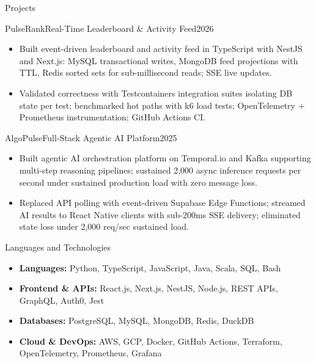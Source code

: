 \documentclass[]{mcdowellcv}
\begin{document}
\begin{cvsection}{Projects}
  \begin{cvsubsection}{PulseRank}{Real-Time Leaderboard \& Activity Feed}{2026}
    \begin{itemize}
      \item Built event-driven leaderboard and activity feed in TypeScript with NestJS and Next.js: MySQL transactional writes, MongoDB feed projections with TTL, Redis sorted sets for sub-millisecond reads; SSE live updates.
      \item Validated correctness with Testcontainers integration suites isolating DB state per test; benchmarked hot paths with k6 load tests; OpenTelemetry + Prometheus instrumentation; GitHub Actions CI.
    \end{itemize}
    \vspace{-1.5pt}
  \end{cvsubsection}

  \begin{cvsubsection}{AlgoPulse}{Full-Stack Agentic AI Platform}{2025}
    \begin{itemize}
      \item Built agentic AI orchestration platform on Temporal.io and Kafka supporting multi-step reasoning pipelines; sustained 2,000 async inference requests per second under sustained production load with zero message loss.
      \item Replaced API polling with event-driven Supabase Edge Functions; streamed AI results to React Native clients with sub-200ms SSE delivery; eliminated state loss under 2,000 req/sec sustained load.
    \end{itemize}
  \end{cvsubsection}
\end{cvsection}

\begin{cvsection}{Languages and Technologies}
  \begin{cvsubsection}{}{}{}
    \begin{itemize}
      \item \textbf{Languages:} Python, TypeScript, JavaScript, Java, Scala, SQL, Bash
      \item \textbf{Frontend \& APIs:} React.js, Next.js, NestJS, Node.js, REST APIs, GraphQL, Auth0, Jest
      \item \textbf{Databases:} PostgreSQL, MySQL, MongoDB, Redis, DuckDB
      \item \textbf{Cloud \& DevOps:} AWS, GCP, Docker, GitHub Actions, Terraform, OpenTelemetry, Prometheus, Grafana
    \end{itemize}
  \end{cvsubsection}
\end{cvsection}
\end{document}
